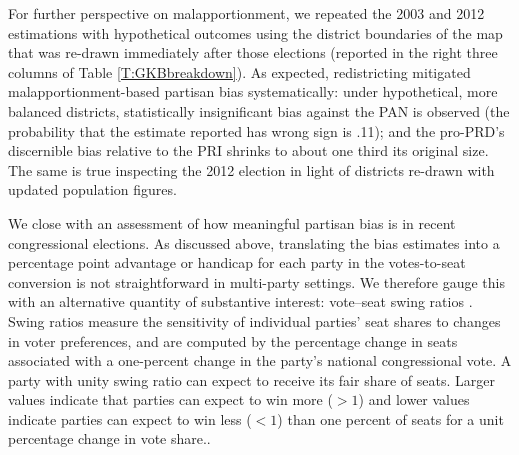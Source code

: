 \documentclass[letter,12pt]{article}
\begin{document}

For further perspective on malapportionment, we repeated the 2003 and 2012 estimations with hypothetical outcomes using the district boundaries of the map that was re-drawn immediately after those elections (reported in the right three columns of Table \ref{T:GKBbreakdown}). As expected, redistricting mitigated malapportionment-based partisan bias systematically: under hypothetical, more balanced districts, statistically insignificant bias against the PAN is observed (the probability that the estimate reported has wrong sign is .11); and the pro-PRD's discernible bias relative to the PRI shrinks to about one third its original size. The same is true inspecting the 2012 election in light of districts re-drawn with updated population figures. 


We close with an assessment of how meaningful partisan bias is in recent congressional elections. As discussed above, translating the bias estimates into a percentage point advantage or handicap for each party in the votes-to-seat conversion is not straightforward in multi-party settings. We therefore gauge this with an alternative quantity of substantive interest: vote--seat swing ratios \citep{tufte1973seatsVotes,niemi.fett1986swing}. Swing ratios measure the sensitivity of individual parties' seat shares to changes in voter preferences, and are computed by the percentage change in seats associated with a one-percent change in the party's national congressional vote. A party with unity swing ratio can expect to receive its fair share of seats. Larger values indicate that parties can expect to win more ($>1$) and lower values indicate parties can expect to win less ($<1$) than one percent of seats for a unit percentage change in vote share.\citep[We rule out negative swing ratios corresponding to a party losing seats as it wins votes; for violations of the monotonicity principle of representation, see][]{balinskiYoung2001FairRep}. 
\end{document}
